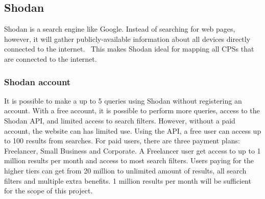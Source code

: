 \subsection{Shodan}\label{sec:shodan}
Shodan is a search engine like Google. Instead of searching for web pages, however, it will gather publicly-available information about all devices directly connected to the internet.~\cite{shodan} This makes Shodan ideal for mapping all CPSs that are connected to the internet.

\subsubsection{Shodan account}
It is possible to make a up to 5 queries using Shodan without registering an account. 
With a free account, it is possible to perform more queries, access to the Shodan API, and limited access to search filters. However, without a paid account, the website can has limited use.
Using the API, a free user can access up to 100 results from searches. 
For paid users, there are three payment plans: Freelancer, Small Business and Corporate. A Freelancer user get access to up to 1 million results per month and access to most search filters. 
Users paying for the higher tiers can get from 20 million to unlimited amount of results, all search filters and multiple extra benefits. 
1 million results per month will be sufficient for the scope of this project.

